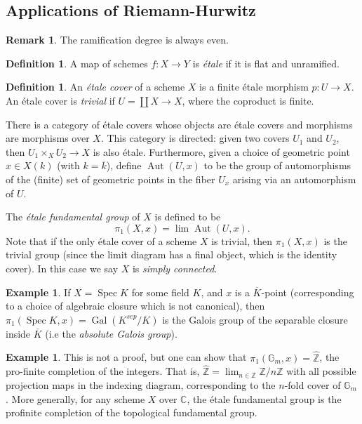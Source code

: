 \documentclass[10pt]{article}
\theoremstyle{definition}
\newtheorem{exmp}[thm]{Example}
\newtheorem{defn}[thm]{Definition}
\newtheorem{rmk}[thm]{Remark}
\DeclareMathOperator{\Spec}{Spec}
\DeclareMathOperator{\Gal}{Gal}
\newcommand{\Z}{\mathbb{Z}}
\newcommand{\C}{\mathbb{C}}
\newcommand{\G}{\mathbb{G}}
\DeclareMathOperator{\Aut}{Aut}
\begin{document}
\subsection{Applications of Riemann-Hurwitz}

\begin{rmk}
The ramification degree is always even.
\end{rmk}

\begin{defn}
A map of schemes $f: X \rightarrow Y$ is \emph{\'{e}tale} if it is flat and unramified.
\end{defn}

\begin{defn}
An \emph{\'{e}tale cover} of a scheme $X$ is a finite \'{e}tale morphism $p: U \rightarrow X$.  An \'{e}tale cover is \emph{trivial} if $U = \coprod X \rightarrow X$, where the coproduct is finite.

There is a category of \'{e}tale covers whose objects are \'{e}tale covers and morphisms are morphisms over $X$.  This category is directed: given two covers $U_1$ and $U_2$, then $U_1 \times_X U_2 \rightarrow X$ is also \'{e}tale.  Furthermore, given a choice of geometric point $x \in X(k)$ (with $k = \overline{k}$), define $\Aut(U, x)$ to be the group of automorphisms of the (finite) set of geometric points in the fiber $U_x$ arising via an automorphism of $U$.

The \emph{\'{e}tale fundamental group} of $X$ is defined to be
$$\pi_1(X, x) = \lim \Aut(U, x).$$
Note that if the only \'{e}tale cover of a scheme $X$ is trivial, then $\pi_1(X, x)$ is the trivial group (since the limit diagram has a final object, which is the identity cover).  In this case we say $X$ is \emph{simply connected}.
\end{defn}


\begin{exmp}
If $X = \Spec K$ for some field $K$, and $x$ is a $\overline{K}$-point (corresponding to a choice of algebraic closure which is not canonical), then $\pi_1(\Spec K, x) = \Gal(K^{sep}/K)$ is the Galois group of the separable closure inside $\overline{K}$ (i.e the \emph{absolute Galois group}).
\end{exmp}

\begin{exmp}
This is not a proof, but one can show that $\pi_1(\G_m, x) = \widehat{\Z}$, the pro-finite completion of the integers.  That is, $\widehat{\Z} = \lim_{n \in \Z} \Z/n\Z$ with all possible projection maps in the indexing diagram, corresponding to the $n$-fold cover of $\G_m$.  More generally, for any scheme $X$ over $\C$, the \'{e}tale fundamental group is the profinite completion of the topological fundamental group.
\end{exmp}
\end{document}
